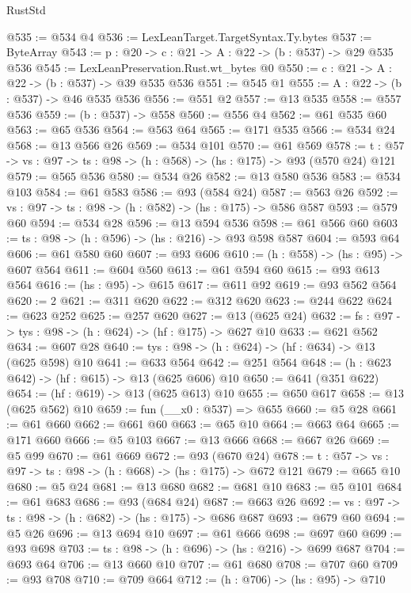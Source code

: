 \begin{lexlean}{RustStd}
\begin{coremodule}
@535 := @534 @4
@536 := LexLeanTarget.TargetSyntax.Ty.bytes
@537 := ByteArray
@543 := {p : @20} -> {c : @21} -> {A : @22} -> (b : @537) -> @29 @535 @536
@545 := LexLeanPreservation.Rust.wt_bytes @0
@550 := {c : @21} -> {A : @22} -> (b : @537) -> @39 @535 @536
@551 := @545 @1
@555 := {A : @22} -> (b : @537) -> @46 @535 @536
@556 := @551 @2
@557 := @13 @535
@558 := @557 @536
@559 := (b : @537) -> @558
@560 := @556 @4
@562 := @61 @535 @60
@563 := @65 @536
@564 := @563 @64
@565 := @171 @535
@566 := @534 @24
@568 := @13 @566 @26
@569 := @534 @101
@570 := @61 @569
@578 := {t : @57} -> {vs : @97} -> {ts : @98} -> (h : @568) -> (hs : @175) -> @93 (@570 @24) @121
@579 := @565 @536
@580 := @534 @26
@582 := @13 @580 @536
@583 := @534 @103
@584 := @61 @583
@586 := @93 (@584 @24)
@587 := @563 @26
@592 := {vs : @97} -> {ts : @98} -> (h : @582) -> (hs : @175) -> @586 @587
@593 := @579 @60
@594 := @534 @28
@596 := @13 @594 @536
@598 := @61 @566 @60
@603 := {ts : @98} -> (h : @596) -> (hs : @216) -> @93 @598 @587
@604 := @593 @64
@606 := @61 @580 @60
@607 := @93 @606
@610 := (h : @558) -> (hs : @95) -> @607 @564
@611 := @604 @560
@613 := @61 @594 @60
@615 := @93 @613 @564
@616 := (hs : @95) -> @615
@617 := @611 @92
@619 := @93 @562 @564
@620 := 2
@621 := @311 @620
@622 := @312 @620
@623 := @244 @622
@624 := @623 @252
@625 := @257 @620
@627 := @13 (@625 @24)
@632 := {fs : @97} -> {tys : @98} -> (h : @624) -> (hf : @175) -> @627 @10
@633 := @621 @562
@634 := @607 @28
@640 := {tys : @98} -> (h : @624) -> (hf : @634) -> @13 (@625 @598) @10
@641 := @633 @564
@642 := @251 @564
@648 := (h : @623 @642) -> (hf : @615) -> @13 (@625 @606) @10
@650 := @641 (@351 @622)
@654 := (hf : @619) -> @13 (@625 @613) @10
@655 := @650 @617
@658 := @13 (@625 @562) @10
@659 := fun (__x0 : @537) => @655
@660 := @5 @28
@661 := @61 @660
@662 := @661 @60
@663 := @65 @10
@664 := @663 @64
@665 := @171 @660
@666 := @5 @103
@667 := @13 @666
@668 := @667 @26
@669 := @5 @99
@670 := @61 @669
@672 := @93 (@670 @24)
@678 := {t : @57} -> {vs : @97} -> {ts : @98} -> (h : @668) -> (hs : @175) -> @672 @121
@679 := @665 @10
@680 := @5 @24
@681 := @13 @680
@682 := @681 @10
@683 := @5 @101
@684 := @61 @683
@686 := @93 (@684 @24)
@687 := @663 @26
@692 := {vs : @97} -> {ts : @98} -> (h : @682) -> (hs : @175) -> @686 @687
@693 := @679 @60
@694 := @5 @26
@696 := @13 @694 @10
@697 := @61 @666
@698 := @697 @60
@699 := @93 @698
@703 := {ts : @98} -> (h : @696) -> (hs : @216) -> @699 @687
@704 := @693 @64
@706 := @13 @660 @10
@707 := @61 @680
@708 := @707 @60
@709 := @93 @708
@710 := @709 @664
@712 := (h : @706) -> (hs : @95) -> @710

\end{coremodule}
\end{lexlean}
